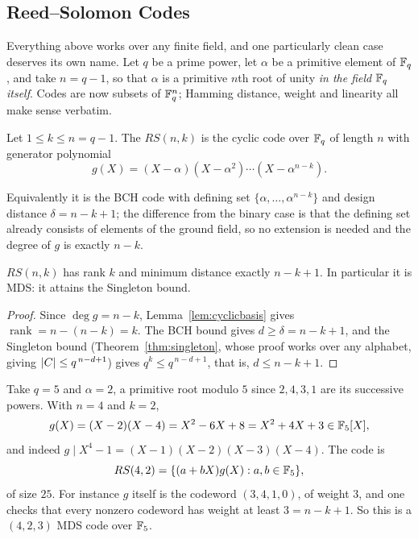 \documentclass[a4paper]{scrartcl}
\DeclareMathOperator{\rank}{rank}
\begin{document}
\subsection{Reed--Solomon Codes}

Everything above works over any finite field, and one particularly clean case deserves its own name. Let $q$ be a prime power, let $\alpha$ be a primitive element of $\mathbb{F}_q$, and take $n = q-1$, so that $\alpha$ is a primitive $n$th root of unity \emph{in the field $\mathbb{F}_q$ itself}. Codes are now subsets of $\mathbb{F}_q^n$; Hamming distance, weight and linearity all make sense verbatim.

\begin{definition}
	Let $1 \le k \le n = q-1$. The  $RS(n,k)$ is the cyclic code over $\mathbb{F}_q$ of length $n$ with generator polynomial
	$$g(X) = (X-\alpha)(X-\alpha^2)\cdots(X-\alpha^{n-k}).$$
\end{definition}

Equivalently it is the BCH code with defining set $\{\alpha,\dots,\alpha^{n-k}\}$ and design distance $\delta = n-k+1$; the difference from the binary case is that the defining set already consists of elements of the ground field, so no extension is needed and the degree of $g$ is exactly $n - k$.

\begin{proposition}
	$RS(n,k)$ has rank $k$ and minimum distance exactly $n-k+1$. In particular it is MDS: it attains the Singleton bound.
\end{proposition}

\begin{proof}
	Since $\deg g = n-k$, Lemma~\ref{lem:cyclicbasis} gives $\rank = n - (n-k) = k$. The BCH bound gives $d \ge \delta = n-k+1$, and the Singleton bound (Theorem~\ref{thm:singleton}, whose proof works over any alphabet, giving $\lvert C\rvert\le q^{\,n-d+1}$) gives $q^k \le q^{\,n-d+1}$, that is, $d \le n-k+1$.
\end{proof}

\begin{example}
	Take $q = 5$ and $\alpha = 2$, a primitive root modulo $5$ since $2,4,3,1$ are its successive powers. With $n = 4$ and $k = 2$,
	$$g(X) = (X-2)(X-4) = X^2-6X+8 = X^2+4X+3 \in \mathbb{F}_5[X],$$
	and indeed $g \mid X^4-1 = (X-1)(X-2)(X-3)(X-4)$. The code is
	$$RS(4,2) = \{(a+bX)g(X) : a,b\in\mathbb{F}_5\},$$
	of size $25$. For instance $g$ itself is the codeword $(3,4,1,0)$, of weight $3$, and one checks that every nonzero codeword has weight at least $3 = n-k+1$. So this is a $(4,2,3)$ MDS code over $\mathbb{F}_5$.
\end{example}
\end{document}
